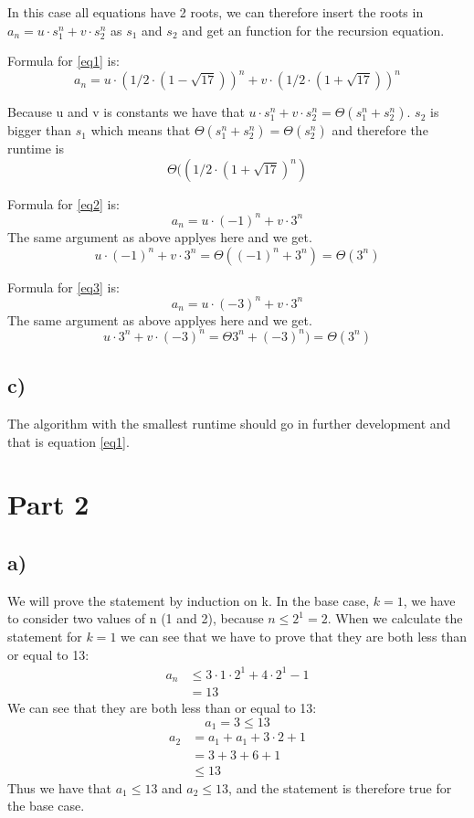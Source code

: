 \documentclass[a4paper]{article}
\begin{document}
In this case all equations have 2 roots, we can therefore insert the roots in \(a_n=u \cdot s_1^n + v \cdot s_2^n\) as \(s_1\) and \(s_2\) and get an function for the recursion equation.

Formula for \ref{eq1} is:
\[a_n=u \cdot (1/2 \cdot (1 - \sqrt{17}))^n + v \cdot (1/2 \cdot (1 + \sqrt{17}))^n\]

Because u and v is constants we have that \(u \cdot s_1^n + v \cdot s_2^n = \Theta (s_1^n + s_2^n)\). \(s_2\) is bigger than \(s_1\) which means that \(\Theta (s_1^n + s_2^n) = \Theta (s_2^n)\) and therefore the runtime is \[\Theta ((1/2 \cdot (1 + \sqrt{17})^n)\]


Formula for \ref{eq2} is:
\[a_n=u \cdot (-1)^n + v \cdot 3^n\]
The same argument as above applyes here and we get.
\[u \cdot (-1)^n + v \cdot 3^n = \Theta ((-1)^n + 3^n) = \Theta (3^n)\]


Formula for \ref{eq3} is:
\[a_n=u \cdot (-3)^n + v \cdot 3^n\]
The same argument as above applyes here and we get.
\[u \cdot 3^n + v \cdot (-3)^n = \Theta 3^n + (-3)^n) = \Theta (3^n)\]

\subsection*{c)}
The algorithm with the smallest runtime should go in further development and that is equation \ref{eq1}.

\section*{Part 2}

\subsection*{a)}

We will prove the statement by induction on k.
In the base case, \(k=1\), we have to consider two values of n (1 and 2), because \(n\leq2^1=2\). When we calculate the statement for \(k=1\) we can see that we have to prove that they are both less than or equal to 13:
\[
\begin{aligned}
  a_n & \leq 3 \cdot 1 \cdot 2^1 + 4 \cdot 2^1 - 1\\
  & = 13
\end{aligned}
\]
We can see that they are both less than or equal to 13:
\[
a_1 = 3 \leq 13
\]\[
\begin{aligned}
  a_2 & = a_1 + a_1 + 3 \cdot 2 + 1 \\
  & = 3 + 3 + 6 + 1 \\
  & \leq 13
\end{aligned}
\]
Thus we have that \(a_1 \leq 13\) and \(a_2 \leq 13\), and the statement is therefore true for the base case.
\end{document}
